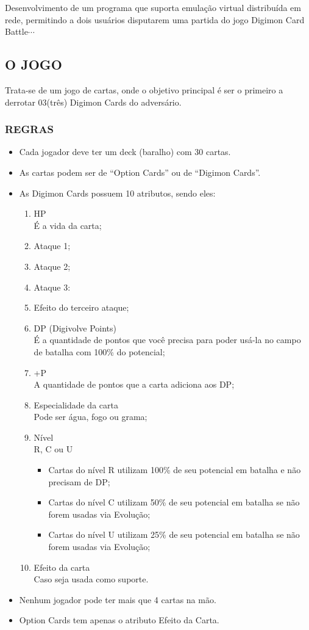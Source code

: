 \documentclass[12pt,a4paper,brazil,abntex2]{article}
\begin{document}
		Desenvolvimento de um programa que suporta emulação virtual distribuída em rede, permitindo a dois usuários disputarem uma partida do jogo Digimon Card Battle$\cdots$
	
	\subsection{\normalsize O JOGO}
		Trata-se de um jogo de cartas, onde o objetivo principal é ser o primeiro a derrotar 03(três) Digimon Cards do adversário.
		
		\subsubsection{\normalsize REGRAS}
			\begin{itemize}
				\item Cada jogador deve ter um deck (baralho) com 30 cartas.
				\item As cartas podem ser de ``Option Cards''  ou de ``Digimon Cards''.
				\item As Digimon Cards possuem 10 atributos, sendo eles:
					\begin{enumerate}

						\item HP\\É a vida da carta;
     					\item Ataque 1;
     					\item Ataque 2;
						\item Ataque 3:
						\item Efeito do terceiro ataque;
						\item DP (Digivolve Points)\\É a quantidade de pontos que você precisa para poder usá-la no campo de batalha com 100\% do potencial;
     					\item +P\\A quantidade de pontos que a carta adiciona aos DP;
     					\item Especialidade da carta\\Pode ser água, fogo ou grama;
     					\item Nível\\R, C ou U\\
							\begin{itemize}
								\item Cartas do nível R utilizam 100\% de seu potencial em batalha e não precisam de DP; 
								\item Cartas do nível C utilizam 50\% de seu potencial em batalha se não forem usadas via Evolução; 
								\item Cartas do nível U utilizam 25\% de seu potencial em batalha se não forem usadas via Evolução; 
								\end{itemize}
						\item Efeito da carta\\Caso seja usada como suporte.
					\end{enumerate}
				\item Nenhum jogador pode ter mais que 4 cartas na mão.
				\item Option Cards tem apenas o atributo Efeito da Carta.
			\end{itemize}				
\end{document}
